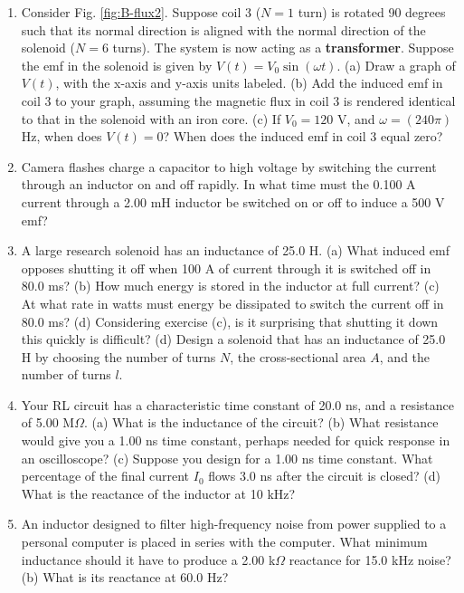\documentclass[12pt,twocolumn]{article}
\begin{document}
\begin{enumerate}
\item Consider Fig. \ref{fig:B-flux2}.  Suppose coil 3 ($N=1$ turn) is rotated 90 degrees such that its normal direction is aligned with the normal direction of the solenoid ($N=6$ turns).  The system is now acting as a \textbf{transformer}.  Suppose the emf in the solenoid is given by $V(t) = V_0 \sin(\omega t)$. (a) Draw a graph of $V(t)$, with the x-axis and y-axis units labeled.  (b) Add the induced emf in coil 3 to your graph, assuming the magnetic flux in coil 3 is rendered identical to that in the solenoid with an iron core.  (c) If $V_0 = 120$ V, and $\omega = (240\pi)$ Hz, when does $V(t) = 0$? When does the induced emf in coil 3 equal zero? \\ \vspace{4cm}
\item Camera flashes charge a capacitor to high voltage by switching the current through an inductor on and off rapidly. In what time must the 0.100 A current through a 2.00 mH inductor be switched on or off to induce a 500 V emf? \\ \vspace{1cm}
\item A large research solenoid has an inductance of 25.0 H. (a) What induced emf opposes shutting it off when 100 A of current through it is switched off in 80.0 ms? (b) How much energy is stored in the inductor at full current? (c) At what rate in watts must energy be dissipated to switch the current off in 80.0 ms? (d) Considering exercise (c), is it surprising that shutting it down this quickly is difficult? (d) Design a solenoid that has an inductance of 25.0 H by choosing the number of turns $N$, the cross-sectional area $A$, and the number of turns $l$. \\ \vspace{4cm}
\item Your RL circuit has a characteristic time constant of 20.0 ns, and a resistance of 5.00 M$\Omega$. (a) What is the inductance of the circuit? (b) What resistance would give you a 1.00 ns time constant, perhaps needed for quick response in an oscilloscope? (c) Suppose you design for a 1.00 ns time constant.  What percentage of the final current $I_0$ flows 3.0 ns after the circuit is closed? (d) What is the reactance of the inductor at 10 kHz? \\ \vspace{2cm}
\item An inductor designed to filter high-frequency noise from power supplied to a personal computer is placed in series with the computer. What minimum inductance should it have to produce a 2.00 k$\Omega$ reactance for 15.0 kHz noise? (b) What is its reactance at 60.0 Hz? \\ \vspace{1.5cm}

\end{enumerate}
\end{document}
